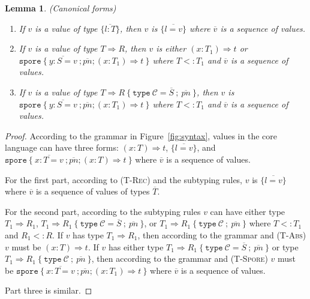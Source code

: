 \documentclass[a4paper,twoside]{article}
\newcommand{\seq}[1]{\overline{#1}}
\newtheorem{lemma}[theorem]{Lemma}
\begin{document}
\begin{lemma}
\emph{(Canonical forms)}
\label{lem:canonical}
\begin{enumerate}

\item If $v$ is a value of type $\{ \seq{l : T} \}$, then $v$ is $\{ \seq{l = v} \}$ where $\seq{v}$ is a sequence of values.

\item If $v$ is a value of type $T \Rightarrow R$, then $v$ is either $(x: T_1) \Rightarrow t$ or \\ $\texttt{spore}~\{~\seq{y : S = v}~; \seq{pn} ; (x: T_1) \Rightarrow t~\}$ where $T <: T_1$ and $\seq{v}$ is a sequence of values.

\item If $v$ is a value of type $T \Rightarrow R~\{~\texttt{type}~\mathcal{C} = \seq{S}~;~\seq{pn}~\}$, then $v$ is \\ $\texttt{spore}~\{~\seq{y : S = v}~; \seq{pn} ; (x: T_1) \Rightarrow t~\}$ where $T <: T_1$ and $\seq{v}$ is a sequence of values.


\end{enumerate}
\end{lemma}
\begin{proof}
According to the grammar in Figure~\ref{fig:syntax}, values in the core language can have three forms: $(x: T) \Rightarrow t$, $\{ \seq{l = v} \}$, and $\texttt{spore}~\{~\seq{x : T = v}~; \seq{pn} ; (x: T) \Rightarrow t~\}$ where $\seq{v}$ is a sequence of values.

For the first part, according to (\textsc{T-Rec}) and the subtyping rules, $v$ is $\{ \seq{l = v} \}$ where $\seq{v}$ is a sequence of values of types $\seq{T}$.

For the second part, according to the subtyping rules $v$ can have either type $T_1 \Rightarrow R_1$, $T_1 \Rightarrow R_1~\{~\texttt{type}~\mathcal{C} = \seq{S}~;~\seq{pn}~\}$, or $T_1 \Rightarrow R_1~\{~\texttt{type}~\mathcal{C}~;~\seq{pn}~\}$ where $T <: T_1$ and $R_1 <: R$. If $v$ has type $T_1 \Rightarrow R_1$, then according to the grammar and (\textsc{T-Abs}) $v$ must be $(x: T) \Rightarrow t$. If $v$ has either type $T_1 \Rightarrow R_1~\{~\texttt{type}~\mathcal{C} = \seq{S}~;~\seq{pn}~\}$ or type $T_1 \Rightarrow R_1~\{~\texttt{type}~\mathcal{C}~;~\seq{pn}~\}$, then according to the grammar and (\textsc{T-Spore}) $v$ must be $\texttt{spore}~\{~\seq{x : T = v}~; \seq{pn} ; (x: T_1) \Rightarrow t~\}$ where $\seq{v}$ is a sequence of values.

Part three is similar.
\end{proof}
\end{document}
